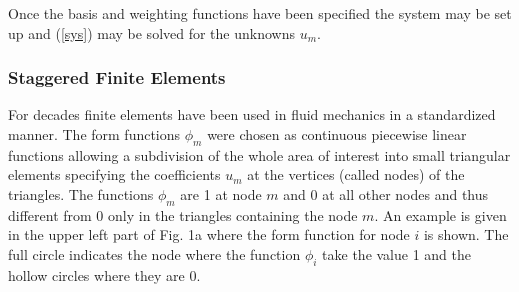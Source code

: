 Once the basis and weighting functions have been specified the system
may be set up and (\ref{sys}) may be solved for the unknowns $u_{m}$.






\subsubsection{Staggered Finite Elements}

For decades finite elements have been used in fluid mechanics in
a standardized manner.
The form functions $\phi_{m}$ were chosen as continuous piecewise linear
functions allowing a subdivision of the whole area of interest into small
triangular elements specifying the coefficients $u_{m}$ at the vertices
(called nodes)
of the triangles. The functions $\phi_{m}$ are 1 at node
$m$ and 0 at all other nodes and thus different from 0 only in the
triangles containing the node $m$.
An example is given in the upper left part of Fig. 1a
where the form function for node $i$ is shown. The full circle indicates
the node where the function $\phi_{i}$ take the value
1 and the hollow circles where they are 0.


